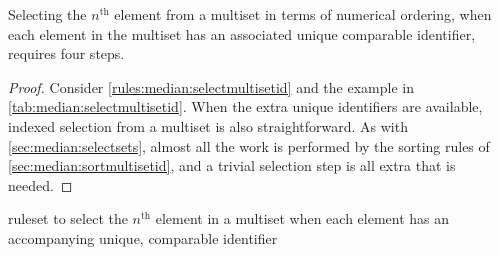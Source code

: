 \begin{proposition}\label{prop:median:selectmultisetid}
Selecting the \(n^{\text{th}}\) element from a multiset in terms of numerical ordering, when each element in the multiset has an associated unique comparable identifier, requires four steps.
\end{proposition}

\begin{proof}
Consider \cref{rules:median:selectmultisetid} and the example in \cref{tab:median:selectmultisetid}.  When the extra unique identifiers are available, indexed selection from a multiset is also straightforward. As with \cref{sec:median:selectsets}, almost all the work is performed by the sorting rules of \cref{sec:median:sortmultisetid}, and a trivial selection step is all extra that is needed.
\end{proof}

\begin{cprulesetfloat} \begin{cpruleset}



\end{cpruleset}
\caption{\label{rules:median:selectmultisetid}\Gls{ruleset} to select the \(n^{\text{th}}\) element in a multiset when each element has an accompanying unique, comparable identifier}
\end{cprulesetfloat}

